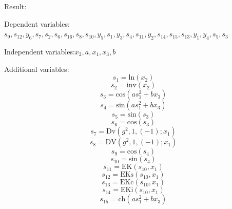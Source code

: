 \documentclass[10pt,a4paper]{article}
\begin{document}
Result:

Dependent variables:$s_{9}, s_{12}, y_{6}, s_{7}, s_{2}, s_{6}, s_{16}, s_{8}, s_{10}, y_{5}, s_{1}, y_{3}, s_{4}, s_{11}, y_{2}, s_{14}, s_{15}, s_{13}, y_{1}, y_{4}, s_{5}, s_{3}$

Independent variables:$x_{2}, a, x_{1}, x_{3}, b$

Additional variables:
\begin{dmath*}s_{1} = \text{ln}\left(x_{2}\right)\end{dmath*}
\begin{dmath*}s_{2} = \text{inv}\left(x_{2}\right)\end{dmath*}
\begin{dmath*}s_{3} = \text{cos}\left(a  s_{1} ^ {2} + b  x_{3}\right)\end{dmath*}
\begin{dmath*}s_{4} = \text{sin}\left(a  s_{1} ^ {2} + b  x_{3}\right)\end{dmath*}
\begin{dmath*}s_{5} = \text{sin}\left(s_{3}\right)\end{dmath*}
\begin{dmath*}s_{6} = \text{cos}\left(s_{3}\right)\end{dmath*}
\begin{dmath*}s_{7} = \text{Dv}\left(g ^ {2}, 1, \left(-1\right); x_{1}\right)\end{dmath*}
\begin{dmath*}s_{8} = \text{DV}\left(g ^ {2}, 1, \left(-1\right); x_{1}\right)\end{dmath*}
\begin{dmath*}s_{9} = \text{cos}\left(s_{4}\right)\end{dmath*}
\begin{dmath*}s_{10} = \text{sin}\left(s_{4}\right)\end{dmath*}
\begin{dmath*}s_{11} = \text{EK}\left(s_{10}, x_{1}\right)\end{dmath*}
\begin{dmath*}s_{12} = \text{EKs}\left(s_{10}, x_{1}\right)\end{dmath*}
\begin{dmath*}s_{13} = \text{EKc}\left(s_{10}, x_{1}\right)\end{dmath*}
\begin{dmath*}s_{14} = \text{EKi}\left(s_{10}, x_{1}\right)\end{dmath*}
\begin{dmath*}s_{15} = \text{ch}\left(a  s_{1} ^ {2} + b  x_{3}\right)\end{dmath*}
\end{document}
